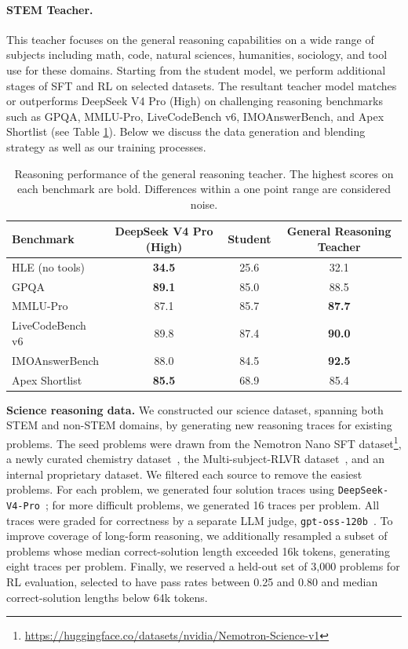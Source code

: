 \paragraph{STEM Teacher.}
This teacher focuses on the general reasoning capabilities on a wide range of subjects including math, code, natural sciences, humanities, sociology, and tool use for these domains. Starting from the student model, we perform additional stages of SFT and RL on selected datasets. The resultant teacher model matches or outperforms DeepSeek V4 Pro (High) on challenging reasoning benchmarks such as GPQA, MMLU-Pro, LiveCodeBench v6, IMOAnswerBench, and Apex Shortlist (see Table \ref{reasoning_teacher_scores}). Below we discuss the data generation and blending strategy as well as our training processes.
\begin{table}[!htp]
\centering
\small
\begin{tabular}{l|ccc}
\toprule
Benchmark & DeepSeek V4 Pro (High) & Student & General Reasoning Teacher \\
\midrule
HLE (no tools) & \bf 34.5 & 25.6 & 32.1 \\
GPQA         & \bf 89.1 & 85.0 & 88.5 \\
MMLU-Pro     & 87.1 & 85.7 & \bf 87.7 \\
LiveCodeBench v6     & 89.8 & 87.4 & \bf 90.0 \\
IMOAnswerBench     & 88.0 & 84.5 & \bf 92.5 \\
Apex Shortlist     & \bf 85.5 & 68.9 & 85.4 \\
\bottomrule
\end{tabular}
\caption{\label{reasoning_teacher_scores} Reasoning performance of the general reasoning teacher. The highest scores on each benchmark are bold. Differences within a one point range are considered noise.}
\end{table}

\textbf{Science reasoning data.}
We constructed our science dataset, spanning both STEM and non-STEM domains, by generating new reasoning traces for existing problems. The seed problems were drawn from the Nemotron Nano SFT dataset\footnote{\url{https://huggingface.co/datasets/nvidia/Nemotron-Science-v1}}, a newly curated chemistry dataset~\citep{li2025chemicalqaevaluatingllms, zhang2024chemllm}, the Multi-subject-RLVR dataset~\citep{su2025expanding}, and an internal proprietary dataset. We filtered each source to remove the easiest problems. For each problem, we generated four solution traces using \texttt{DeepSeek-V4-Pro}~\citep{deepseekai2026deepseekv4}; for more difficult problems, we generated 16 traces per problem. All traces were graded for correctness by a separate LLM judge, \texttt{gpt-oss-120b}~\citep{openai2025gptoss120bgptoss20bmodel}. To improve coverage of long-form reasoning, we additionally resampled a subset of problems whose median correct-solution length exceeded 16k tokens, generating eight traces per problem. Finally, we reserved a held-out set of 3,000 problems for RL evaluation, selected to have pass rates between 0.25 and 0.80 and median correct-solution lengths below 64k tokens.

